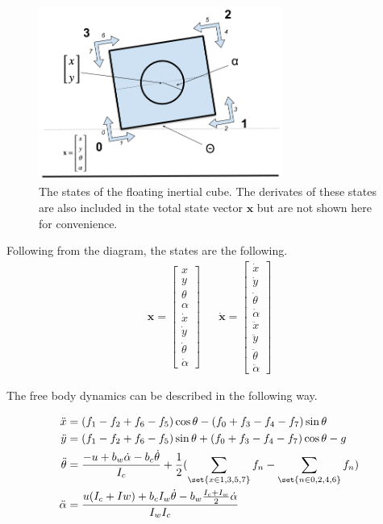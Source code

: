 \documentclass[conference]{IEEEtran}
\begin{document}
\begin{figure}[htbp]
\centerline{\includegraphics[width=8cm,keepaspectratio]{media/cube_states.png}}
\caption{The states of the floating inertial cube. The derivates of these states are also included in the total state vector $\textbf{x}$ but are not shown here for convenience.}
\label{fig}
\end{figure}

Following from the diagram, the states are the following. \\

\begin{align}
  \textbf{x} =
    \begin{bmatrix}
         x \\
         y \\
         \theta \\
         \alpha \\
         \dot x \\
         \dot y \\
         \dot \theta \\
         \dot \alpha
    \end{bmatrix} &&
  \bm{\dot x} =
    \begin{bmatrix}
         \dot x \\
         \dot y \\
         \dot \theta \\
         \dot \alpha \\
         \ddot x \\
         \ddot y \\
         \ddot \theta \\
         \ddot \alpha
    \end{bmatrix}
\end{align}

The free body dynamics can be described in the following way.

\begin{align}
\ddot x &= (f_{1}-f_{2}+f_{6}-f_{5})\cos{\theta} - (f_{0}+f_{3}-f_{4}-f_{7})\sin{\theta} \\
\ddot y &= (f_{1}-f_{2}+f_{6}-f_{5})\sin{\theta} + (f_{0}+f_{3}-f_{4}-f_{7})\cos{\theta}-g \\
\ddot \theta &= \frac{-u + b_{w}\dot\alpha - b_{c}\dot\theta}{I_c} + \frac{1}{2}(\sum_{\set{x\in{1,3,5,7}}} f_{n} - \sum_{\set{n\in{0,2,4,6}}} f_{n}) \\
\ddot \alpha &= \frac{u(I_{c}+I{w}) + b_{c}I_{w}\dot\theta - b_{w}\frac{I_{c}+I_{w}}{2}\dot\alpha}{I_{w}I_{c}}
\end{align}
\end{document}
